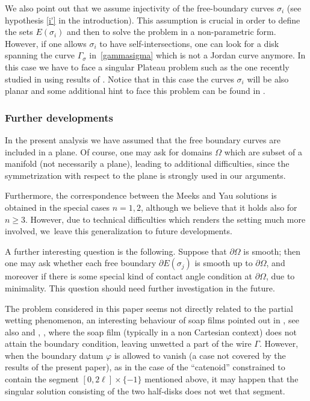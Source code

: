 \documentclass[JEP,XML,SOM,Unicode, NoFloatCountersInSection,published]{cedram}
\let\Om\Omega
\theoremstyle{definition}
\begin{document}
We also point out that we assume injectivity of the free-boundary
curves $\sigma_i$ (see hypothesis \ref{i'} in the introduction).
This assumption is crucial in order to define the sets
$E(\sigma_i)$ and then to solve the problem in a non-parametric form.
However, if one allows $\sigma_i$ to have self-intersections,
one can look for a disk spanning the curve $\Gamma_\sigma$
in~\eqref{gammasigma} which is not a Jordan curve anymore.
In this case we have to face a singular Plateau problem such as the one
recently studied in \cite{Creutz}
using results of \cite{LW}. Notice that in this case the curves $\sigma_i$ will be also planar and some additional hint to face this problem can be found in \cite{CS}.

\subsubsection*{Further developments} In the present analysis we have assumed that the free boundary curves are included in a plane. Of course, one may ask for domains $\Omega$ which are subset of a manifold (not necessarily a plane), leading to additional difficulties,
since the symmetrization with respect to the plane is strongly used in our arguments.

Furthermore, the correspondence between the Meeks and Yau
solutions is obtained in the special cases $n=1,2$,
although we believe that it holds also for $n\geq3$. However, due to technical difficulties which renders the setting much more involved, we~leave this generalization to future developments.

A further interesting question
is the following. Suppose that
$\partial \Om$ is smooth; then one may ask whether each free
boundary $\partial E(\sigma_j)$
is smooth up to $\partial \Om$, and moreover if there is some special
kind of contact angle condition at $\partial \Om$, due to minimality.
This question should need further investigation in the future.

The problem
considered in this paper seems not directly related to the
partial wetting phenomenon, an interesting behaviour of
soap films pointed out in \cite{Almgren}, see also
\cite{Brakke} and
\cite{2017_Bellettini_Paolini_Pasquarelli}, \cite{BPPS},
where the soap film
(typically in a non Cartesian context) does not
attain the boundary condition, leaving unwetted a part of the
wire $\Gamma$.
However, when the boundary datum $\varphi$ is allowed
to vanish (a case not covered by the results of the present paper),
as in the case of the ``catenoid'' constrained to contain the segment $[0,2\ell] \times \{-1\}$
mentioned above,
it may happen that the
singular solution consisting of
the two half-disks does not wet that segment.
\end{document}
